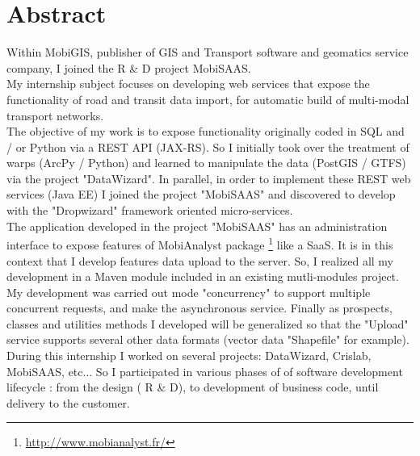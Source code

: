 \chapter*{Abstract}

Within MobiGIS, publisher of GIS and Transport software and geomatics service company, I joined the R \& D project MobiSAAS. \\

My internship subject focuses on developing web services that expose the functionality of road and transit data import, for automatic build of multi-modal transport networks. \\

The objective of my work is to expose functionality originally coded in SQL and / or Python via a REST API (JAX-RS). So I initially took over the treatment of warps (ArcPy / Python) and learned to manipulate the data (PostGIS / GTFS) via the project "DataWizard". In parallel, in order to implement these REST web services (Java EE) I joined the project "MobiSAAS" and discovered to develop with the "Dropwizard" framework oriented micro-services. \\

The application developed in the project "MobiSAAS" has an administration interface to expose features of MobiAnalyst package \footnote{\url{http://www.mobianalyst.fr/}} like a SaaS. It is in this context that I develop features data upload to the server. So, I realized all my development in a Maven module included in an existing mutli-modules project. My development was carried out mode "concurrency" to support multiple concurrent requests, and make the asynchronous service. Finally as prospects, classes and utilities methods I developed will be generalized so that the "Upload" service supports several other data formats (vector data "Shapefile" for example). \\

During this internship I worked on several projects: DataWizard, Crislab, MobiSAAS, etc...  So I participated in various phases of of software development lifecycle : from the design ( R \& D), to development of business code, until delivery to the customer. \\


